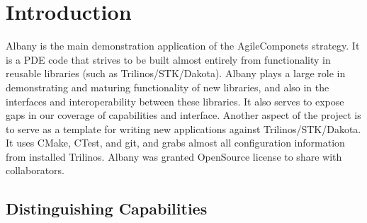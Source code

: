 \documentclass[pdf,12pt,report,strict]{SANDreport}
\theoremstyle{remark}
\begin{document}


%
\SANDmain           %

\chapter{Introduction}
\label{Intro}

Albany is the main demonstration application of the AgileComponets
strategy. It is a PDE code that strives to be built almost entirely
from functionality in reusable libraries (such as
Trilinos/STK/Dakota). Albany plays a large role in demonstrating and
maturing functionality of new libraries, and also in the interfaces
and interoperability between these libraries. It also serves to expose
gaps in our coverage of capabilities and interface. Another aspect of
the project is to serve as a template for writing new applications
against Trilinos/STK/Dakota. It uses CMake, CTest, and git, and grabs
almost all configuration information from installed Trilinos. Albany
was granted OpenSource license to share with collaborators.

\section{Distinguishing Capabilities}
\end{document}
